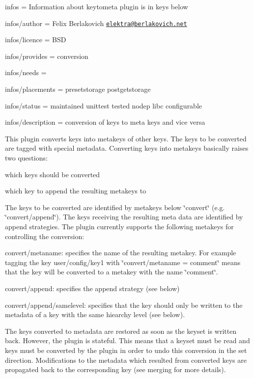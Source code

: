 
\begin{DoxyItemize}
\item infos = Information about keytometa plugin is in keys below
\item infos/author = Felix Berlakovich \href{mailto:elektra@berlakovich.net}{\tt elektra@berlakovich.\+net}
\item infos/licence = B\+S\+D
\item infos/provides = conversion
\item infos/needs =
\item infos/placements = presetstorage postgetstorage
\item infos/status = maintained unittest tested nodep libc configurable
\item infos/description = conversion of keys to meta keys and vice versa
\end{DoxyItemize}

This plugin converts keys into metakeys of other keys. The keys to be converted are tagged with special metadata. Converting keys into metakeys basically raises two questions\+:
\begin{DoxyItemize}
\item which keys should be converted
\item which key to append the resulting metakeys to
\end{DoxyItemize}

The keys to be converted are identified by metakeys below \char`\"{}convert\char`\"{} (e.\+g. \char`\"{}convert/append\char`\"{}). The keys receiving the resulting meta data are identified by append strategies. The plugin currently supports the following metakeys for controlling the conversion\+:


\begin{DoxyItemize}
\item convert/metaname\+: specifies the name of the resulting metakey. For example tagging the key user/config/key1 with \char`\"{}convert/metaname = comment\char`\"{} means that the key will be converted to a metakey with the name \char`\"{}comment\char`\"{}.
\item convert/append\+: specifies the append strategy (see below)
\item convert/append/samelevel\+: specifies that the key should only be written to the metadata of a key with the same hiearchy level (see below).
\end{DoxyItemize}

The keys converted to metadata are restored as soon as the keyset is written back. However, the plugin is stateful. This means that a keyset must be read and keys must be converted by the plugin in order to undo this conversion in the set direction. Modifications to the metadata which resulted from converted keys are propagated back to the corresponding key (see merging for more details).

